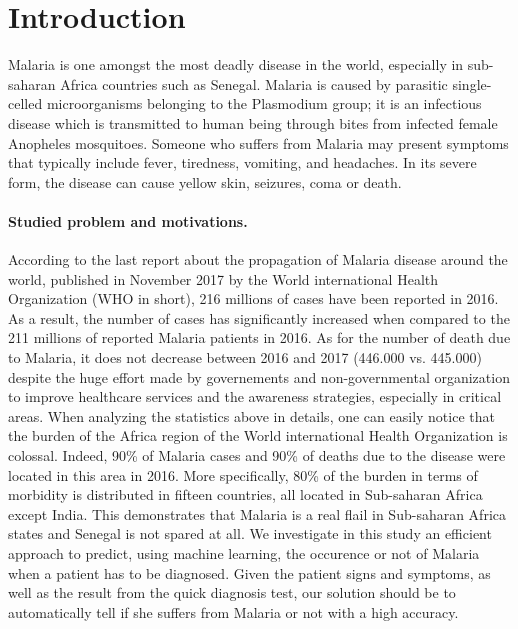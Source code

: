 \section{Introduction}\label{intro}
Malaria is one amongst the most deadly disease in the world, especially in sub-saharan Africa countries such as Senegal.
Malaria is caused by parasitic single-celled microorganisms belonging to the Plasmodium group; it is an infectious
disease which is transmitted to human being through bites from infected female Anopheles mosquitoes. Someone who suffers
from  Malaria may present symptoms that typically include fever, tiredness, vomiting, and headaches. In its severe form,
the disease can cause yellow skin, seizures, coma or death.

\paragraph*{Studied problem and motivations.}
According to the last report about the propagation of Malaria disease around the world, published in November 2017 by the World international Health Organization (WHO in short),
 216 millions of cases have been reported in 2016. As a result, the number of cases has significantly increased when compared to the 211 millions of reported Malaria patients in 2016.
As for the number of death due to Malaria, it does not decrease between 2016 and 2017 (446.000 vs. 445.000) despite the huge effort made by governements
and non-governmental organization to improve healthcare services and the awareness strategies, especially in critical areas. 
When analyzing the statistics above in details, one can easily notice that the burden of the Africa region of the World 
international Health Organization is colossal. Indeed, 90\% of Malaria cases and 90\% of deaths due to the disease were located in this area in 2016.
More specifically, 80\% of the burden in terms of morbidity is distributed in fifteen countries, all located in Sub-saharan Africa except India. This demonstrates
that Malaria is a real flail in Sub-saharan Africa states and Senegal is not spared at all. We investigate in this study an efficient approach to predict, using machine learning, the occurence 
or not of Malaria when a patient has to be diagnosed. Given the patient signs and symptoms, as well as the result from the quick diagnosis test, our solution should be to 
automatically tell if she suffers from Malaria or not with a high accuracy.

